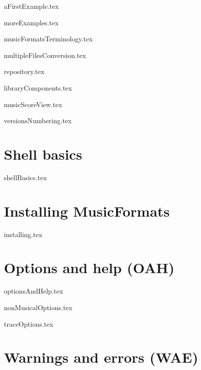 \documentclass[11pt,a4paper]{report}
\begin{document}
{aFirstExample.tex}

{moreExamples.tex}

{musicFormatsTerminology.tex}

{multipleFilesConversion.tex}

{repository.tex}

{libraryComponents.tex}

{musicScoreView.tex}

{versionsNumbering.tex}


\part{Shell basics}

{shellBasics.tex}


\part{Installing MusicFormats}

{installing.tex}


\part{Options and help (OAH)}

{optionsAndHelp.tex}

{nonMusicalOptions.tex}

{traceOptions.tex}



\part{Warnings and errors (WAE)}
\end{document}
